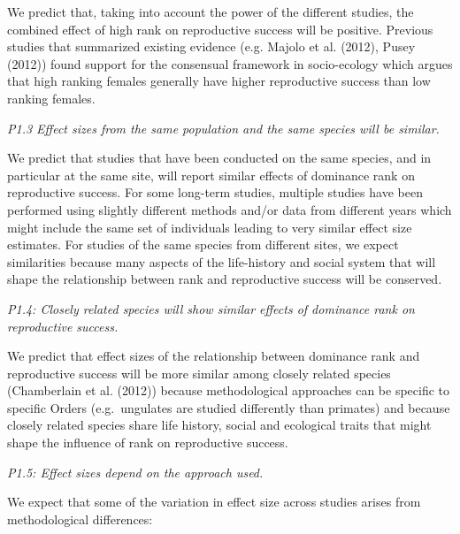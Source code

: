 \documentclass[
]{article}
\begin{document}
We predict that, taking into account the power of the different studies,
the combined effect of high rank on reproductive success will be
positive. Previous studies that summarized existing evidence (e.g.
Majolo et al. (2012), Pusey (2012)) found support for the consensual
framework in socio-ecology which argues that high ranking females
generally have higher reproductive success than low ranking females.

\emph{P1.3 Effect sizes from the same population and the same species
will be similar.}

We predict that studies that have been conducted on the same species,
and in particular at the same site, will report similar effects of
dominance rank on reproductive success. For some long-term studies,
multiple studies have been performed using slightly different methods
and/or data from different years which might include the same set of
individuals leading to very similar effect size estimates. For studies
of the same species from different sites, we expect similarities because
many aspects of the life-history and social system that will shape the
relationship between rank and reproductive success will be conserved.

\emph{P1.4: Closely related species will show similar effects of
dominance rank on reproductive success.}

We predict that effect sizes of the relationship between dominance rank
and reproductive success will be more similar among closely related
species (Chamberlain et al. (2012)) because methodological approaches
can be specific to specific Orders (e.g.~ungulates are studied
differently than primates) and because closely related species share
life history, social and ecological traits that might shape the
influence of rank on reproductive success.

\emph{P1.5: Effect sizes depend on the approach used.}

We expect that some of the variation in effect size across studies
arises from methodological differences:
\end{document}
